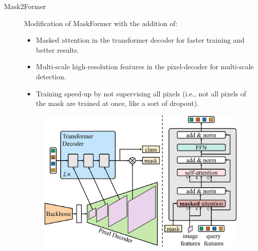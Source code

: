 \begin{description}
    \item[Mask2Former] 
        Modification of MaskFormer with the addition of:
        \begin{itemize}
            \item Masked attention in the transformer decoder for faster training and better results.
            \item Multi-scale high-resolution features in the pixel-decoder for multi-scale detection.
            \item Training speed-up by not supervising all pixels (i.e., not all pixels of the mask are trained at once, like a sort of dropout).
        \end{itemize}

        \begin{figure}[H]
            \centering
            \includegraphics[width=0.45\linewidth]{./img/_mask2former.jpg}
        \end{figure}
\end{description}



